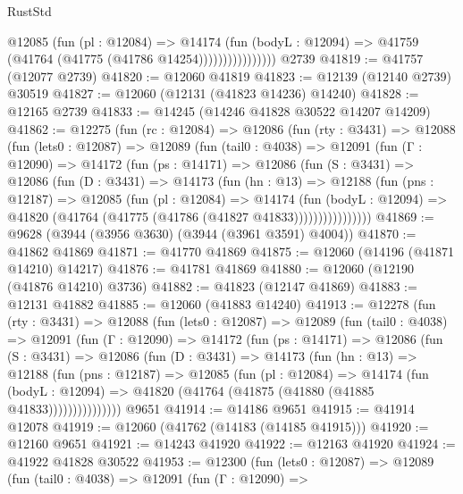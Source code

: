 \begin{lexlean}{RustStd}
\begin{coremodule}
                        @12085
                          (fun (pl : @12084) =>
                          @14174
                            (fun (bodyL : @12094) =>
                            @41759 (@41764 (@41775 (@41786 @14254))))))))))))))))
    @2739
@41819 := @41757 (@12077 @2739)
@41820 := @12060 @41819
@41823 := @12139 (@12140 @2739) @30519
@41827 := @12060 (@12131 (@41823 @14236) @14240)
@41828 := @12165 @2739
@41833 := @14245 (@14246 @41828 @30522 @14207 @14209)
@41862 := @12275
    (fun (rc : @12084) =>
    @12086
      (fun (rty : @3431) =>
      @12088
        (fun (lets0 : @12087) =>
        @12089
          (fun (tail0 : @4038) =>
          @12091
            (fun (Γ : @12090) =>
            @14172
              (fun (ps : @14171) =>
              @12086
                (fun (S : @3431) =>
                @12086
                  (fun (D : @3431) =>
                  @14173
                    (fun (hn : @13) =>
                    @12188
                      (fun (pns : @12187) =>
                      @12085
                        (fun (pl : @12084) =>
                        @14174
                          (fun (bodyL : @12094) =>
                          @41820 (@41764 (@41775 (@41786 (@41827 @41833))))))))))))))))
@41869 := @9628 (@3944 (@3956 @3630) (@3944 (@3961 @3591) @4004))
@41870 := @41862 @41869
@41871 := @41770 @41869
@41875 := @12060 (@14196 (@41871 @14210) @14217)
@41876 := @41781 @41869
@41880 := @12060 (@12190 (@41876 @14210) @3736)
@41882 := @41823 (@12147 @41869)
@41883 := @12131 @41882
@41885 := @12060 (@41883 @14240)
@41913 := @12278
    (fun (rty : @3431) =>
    @12088
      (fun (lets0 : @12087) =>
      @12089
        (fun (tail0 : @4038) =>
        @12091
          (fun (Γ : @12090) =>
          @14172
            (fun (ps : @14171) =>
            @12086
              (fun (S : @3431) =>
              @12086
                (fun (D : @3431) =>
                @14173
                  (fun (hn : @13) =>
                  @12188
                    (fun (pns : @12187) =>
                    @12085
                      (fun (pl : @12084) =>
                      @14174
                        (fun (bodyL : @12094) =>
                        @41820 (@41764 (@41875 (@41880 (@41885 @41833)))))))))))))))
    @9651
@41914 := @14186 @9651
@41915 := @41914 @12078
@41919 := @12060 (@41762 (@14183 (@14185 @41915)))
@41920 := @12160 @9651
@41921 := @14243 @41920
@41922 := @12163 @41920
@41924 := @41922 @41828 @30522
@41953 := @12300
    (fun (lets0 : @12087) =>
    @12089
      (fun (tail0 : @4038) =>
      @12091
        (fun (Γ : @12090) =>

\end{coremodule}
\end{lexlean}
